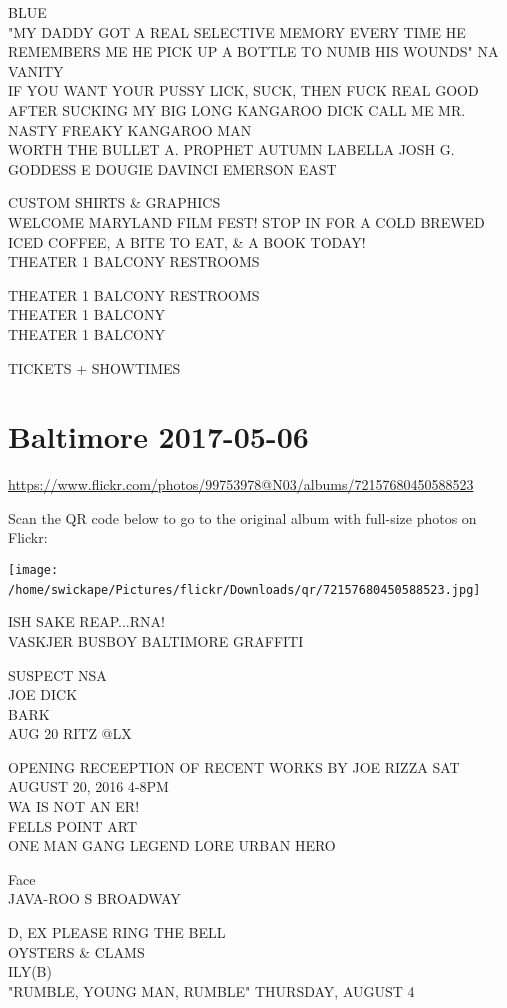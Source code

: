 \documentclass[10pt,letterpaper]{article}
\begin{document}
BLUE\\
"MY DADDY GOT A REAL SELECTIVE MEMORY EVERY TIME HE REMEMBERS ME HE PICK UP A BOTTLE TO NUMB HIS WOUNDS" NA VANITY\\
IF YOU WANT YOUR PUSSY LICK, SUCK, THEN FUCK REAL GOOD AFTER SUCKING MY BIG LONG KANGAROO DICK CALL ME MR. NASTY FREAKY KANGAROO MAN\\
WORTH THE BULLET A. PROPHET AUTUMN LABELLA JOSH G. GODDESS E DOUGIE DAVINCI EMERSON EAST

CUSTOM SHIRTS \& GRAPHICS\\
WELCOME MARYLAND FILM FEST!  STOP IN FOR A COLD BREWED ICED COFFEE, A BITE TO EAT, \& A BOOK TODAY!\\
THEATER 1 BALCONY RESTROOMS

THEATER 1 BALCONY RESTROOMS\\
THEATER 1 BALCONY\\
THEATER 1 BALCONY

TICKETS + SHOWTIMES
\

\section*{Baltimore 2017-05-06}

\url{https://www.flickr.com/photos/99753978@N03/albums/72157680450588523}

Scan the QR code below to go to the original album with full-size photos on Flickr:

\texttt{[image: /home/swickape/Pictures/flickr/Downloads/qr/72157680450588523.jpg]}
\

ISH SAKE REAP...RNA!\\
VASKJER BUSBOY BALTIMORE GRAFFITI

SUSPECT NSA\\
JOE DICK\\
BARK\\
AUG 20 RITZ @LX

OPENING RECEEPTION OF RECENT WORKS BY JOE RIZZA SAT AUGUST 20, 2016 4{-}8PM\\
WA IS NOT AN ER!\\
FELLS POINT ART\\
ONE MAN GANG LEGEND LORE URBAN HERO

Face\\
JAVA{-}ROO S BROADWAY

D, EX PLEASE RING THE BELL\\
OYSTERS \& CLAMS\\
ILY(B)\\
"RUMBLE, YOUNG MAN, RUMBLE" THURSDAY, AUGUST 4
\end{document}
